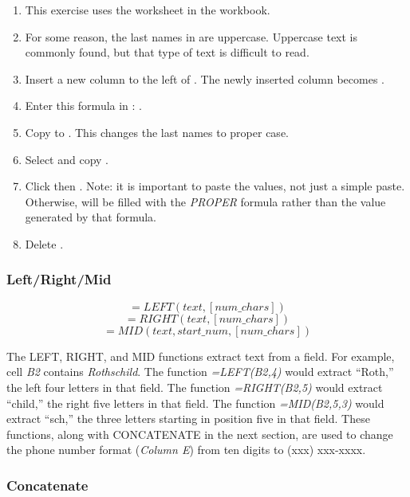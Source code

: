 \begin{enumbox}
	\begin{enumerate}
		\item This exercise uses the  worksheet in the  workbook.
		\item For some reason, the last names in  are uppercase. Uppercase text is commonly found, but that type of text is difficult to read.
		\item Insert a new column to the left of . The newly inserted column becomes .
		\item Enter this formula in : .
		\item Copy  to . This changes the last names to proper case.
		\item Select and copy .
		\item Click  then . Note: it is important to paste the values, not just a simple paste. Otherwise,  will be filled with the \textit{PROPER} formula rather than the value generated by that formula.
		\item Delete .
	\end{enumerate}
\end{enumbox}

\subsubsection{Left/Right/Mid}

\[ =LEFT(text, [num\_chars]) \]
\[ =RIGHT(text, [num\_chars]) \]
\[ =MID(text, start\_num, [num\_chars]) \]

The LEFT, RIGHT, and MID functions extract  text from a field. For example, cell \textit{B2} contains \textit{Rothschild}. The function \textit{=LEFT(B2,4)} would extract ``Roth,'' the left four letters in that field. The function \textit{=RIGHT(B2,5)} would extract ``child,'' the right five letters in that field. The function \textit{=MID(B2,5,3)} would extract ``sch,'' the three letters starting in position five in that field. These functions, along with CONCATENATE in the next section, are used to change the phone number format (\textit{Column E}) from ten digits to (xxx) xxx-xxxx.

\subsubsection{Concatenate}

